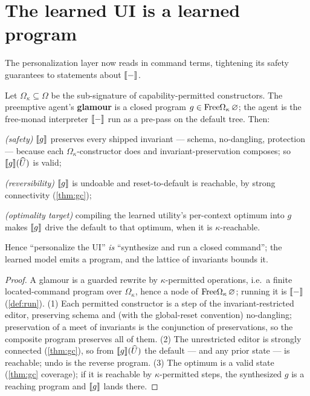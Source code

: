 \documentclass[../uxoxo-main]{subfiles}
\begin{document}
\section{The learned UI is a learned program}\label{sec:learned}
The personalization layer now reads in command terms, tightening its safety
guarantees to statements about $\llbracket - \rrbracket$.

\begin{proposition}\label{prop:glamour}
Let $\Omega_\kappa\subseteq\Omega$ be the sub-signature of capability-permitted
constructors. The preemptive agent's \textbf{glamour} is a closed program
$g\in\mathrm{Free}\Omega_\kappa\,\varnothing$; the agent is the free-monad interpreter
$\llbracket - \rrbracket$ run as a pre-pass on the default tree. Then:
\begin{definitionlist}
  \item \emph{(safety)} $\llbracket g \rrbracket$ preserves every shipped invariant --- schema,
        no-dangling, protection --- because each $\Omega_\kappa$-constructor does
        and invariant-preservation composes; so $\llbracket g \rrbracket(\widehat U)$ is valid;
  \item \emph{(reversibility)} $\llbracket g \rrbracket$ is undoable and reset-to-default is
        reachable, by strong connectivity (\cref{thm:gc});
  \item \emph{(optimality target)} compiling the learned utility's per-context
        optimum into $g$ makes $\llbracket g \rrbracket$ drive the default to that optimum, when it
        is $\kappa$-reachable.
\end{definitionlist}
Hence ``personalize the UI'' \emph{is} ``synthesize and run a closed command''; the
learned model emits a program, and the lattice of invariants bounds it.
\end{proposition}

\begin{proof}
A glamour is a guarded rewrite by $\kappa$-permitted operations, i.e.\ a finite
located-command program over $\Omega_\kappa$, hence a node of
$\mathrm{Free}\Omega_\kappa\,\varnothing$; running it is $\llbracket - \rrbracket$ (\cref{def:run}). (1)
Each permitted constructor is a step of the invariant-restricted editor, preserving
schema and (with the global-reset convention) no-dangling; preservation of a meet of
invariants is the conjunction of preservations, so the composite program preserves
all of them. (2) The unrestricted editor is strongly connected
(\cref{thm:gc}), so from $\llbracket g \rrbracket(\widehat U)$ the default --- and any prior state ---
is reachable; undo is the reverse program. (3) The optimum is a valid state
(\cref{thm:gc} coverage); if it is reachable by $\kappa$-permitted steps, the
synthesized $g$ is a reaching program and $\llbracket g \rrbracket$ lands there.
\end{proof}
\end{document}
